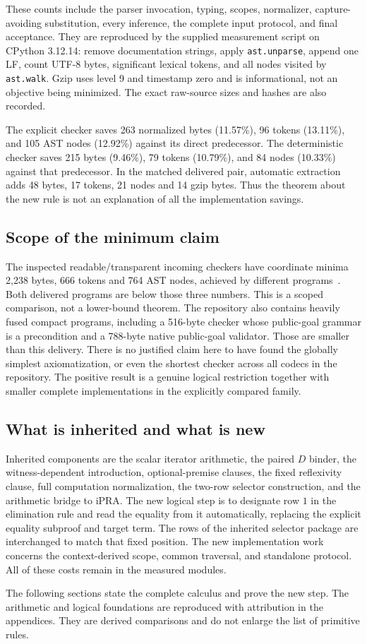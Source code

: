 \documentclass[11pt,letterpaper]{article}
\theoremstyle{definition}\newtheorem{definition}[theorem]{Definition}
\theoremstyle{remark}\newtheorem{remark}[theorem]{Remark}
\begin{document}
These counts include the parser invocation, typing, scopes, normalizer,
capture-avoiding substitution, every inference, the complete input protocol,
and final acceptance. They are reproduced by the supplied measurement
script on CPython 3.12.14: remove documentation strings, apply
\texttt{ast.unparse}, append one LF, count UTF-8 bytes, significant lexical
tokens, and all nodes visited by \texttt{ast.walk}. Gzip uses level 9 and
timestamp zero and is informational, not an objective being minimized.
The exact raw-source sizes and hashes are also recorded.

The explicit checker saves 263 normalized bytes (11.57\%), 96 tokens
(13.11\%), and 105 AST nodes (12.92\%) against its direct predecessor.
The deterministic checker saves 215 bytes (9.46\%), 79 tokens (10.79\%),
and 84 nodes (10.33\%) against that predecessor. In the matched delivered
pair, automatic extraction adds 48 bytes, 17 tokens, 21 nodes and 14 gzip
bytes. Thus the theorem about the new rule is not an explanation of all
the implementation savings.

\subsection{Scope of the minimum claim}

The inspected readable/transparent incoming checkers have coordinate
minima 2,238 bytes, 666 tokens and 764 AST nodes, achieved by different
programs~\cite{binding,clauses}. Both delivered programs are below those
three numbers. This is a scoped comparison, not a lower-bound theorem.
The repository also contains heavily fused compact programs, including
a 516-byte checker whose public-goal grammar is a precondition and a
788-byte native public-goal validator. Those are smaller than this delivery.
There is no justified claim here to have found the globally simplest
axiomatization, or even the shortest checker across all codecs in the
repository. The positive result is a genuine logical restriction together
with smaller complete implementations in the explicitly compared family.

\subsection{What is inherited and what is new}

Inherited components are the scalar iterator arithmetic, the paired
$D$ binder, the witness-dependent introduction, optional-premise clauses,
the fixed reflexivity clause, full computation normalization, the two-row
selector construction, and the arithmetic bridge to iPRA. The new logical
step is to designate row $1$ in the elimination rule and read the equality
from it automatically, replacing the explicit equality subproof and target
term. The rows of the inherited selector package are interchanged to match
that fixed position. The new implementation work concerns the context-derived
scope, common traversal, and standalone protocol. All of these costs remain
in the measured modules.

The following sections state the complete calculus and prove the new step.
The arithmetic and logical foundations are reproduced with attribution in
the appendices. They are derived comparisons and do not enlarge the list of
primitive rules.
\end{document}
